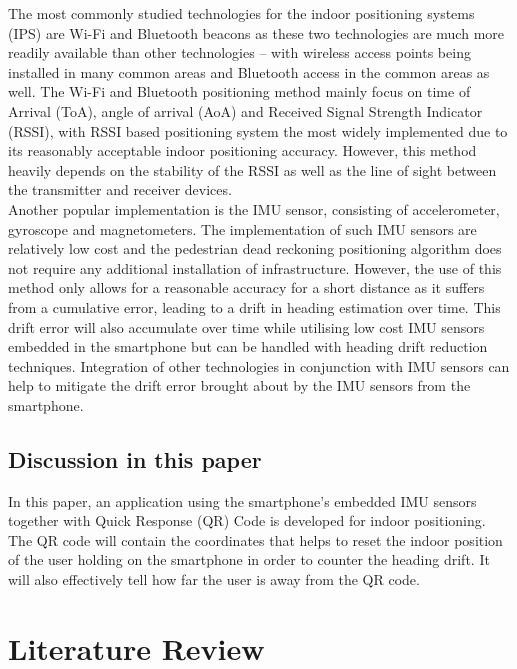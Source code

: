 \documentclass{l4proj}
\begin{document}
The most commonly studied technologies for the indoor positioning systems (IPS) are Wi-Fi and Bluetooth beacons as these two technologies are much more readily available than other technologies – with wireless access points being installed in many common areas and Bluetooth access in the common areas as well. The Wi-Fi and Bluetooth positioning method mainly focus on time of Arrival (ToA), angle of arrival (AoA) and Received Signal Strength Indicator (RSSI), with RSSI based positioning system the most widely implemented due to its reasonably acceptable indoor positioning accuracy. However, this method heavily depends on the stability of the RSSI as well as the line of sight between the transmitter and receiver devices.\\

Another popular implementation is the IMU sensor, consisting of accelerometer, gyroscope and magnetometers. The implementation of such IMU sensors are relatively low cost and the pedestrian dead reckoning positioning algorithm does not require any additional installation of infrastructure. However, the use of this method only allows for a reasonable accuracy for a short distance as it suffers from a cumulative error, leading to a drift in heading estimation over time. This drift error will also accumulate over time while utilising low cost IMU sensors embedded in the smartphone but can be handled with heading drift reduction techniques. Integration of other technologies in conjunction with IMU sensors can help to mitigate the drift error brought about by the IMU sensors from the smartphone.\\

\section{Discussion in this paper}
In this paper, an application using the smartphone’s embedded IMU sensors together with Quick Response (QR) Code is developed for indoor positioning. The QR code will contain the coordinates that helps to reset the indoor position of the user holding on the smartphone in order to counter the heading drift. It will also effectively tell how far the user is away from the QR code.


\chapter{Literature Review}
\end{document}
